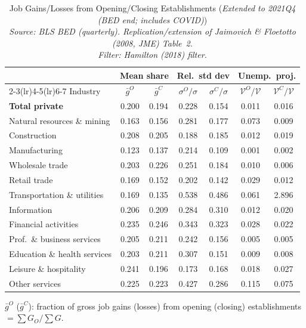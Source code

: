 \begin{table}[htbp]
\centering
\small
\caption{Job Gains/Losses from Opening/Closing Establishments (\emph{Extended to 2021Q4 (BED end; includes COVID)}) \\
  \emph{Source: BLS BED (quarterly). Replication/extension of Jaimovich \& Floetotto (2008, JME) Table~2.} \\  \emph{Filter: Hamilton (2018) filter.}}
\label{tab:jf_t2_ext_2021_ham}
\begin{tabular}{lcccccc}
\toprule
 & \multicolumn{2}{c}{Mean share} & \multicolumn{2}{c}{Rel.\ std dev} & \multicolumn{2}{c}{Unemp.\ proj.} \\
\cmidrule(lr){2-3}\cmidrule(lr){4-5}\cmidrule(lr){6-7}
Industry & $\bar{g}^O$ & $\bar{g}^C$ & $\sigma^O/\sigma$ & $\sigma^C/\sigma$ & $\mathcal{V}^O/\mathcal{V}$ & $\mathcal{V}^C/\mathcal{V}$ \\
\midrule
\midrule
\textbf{Total private} & 0.200 & 0.194 & 0.228 & 0.154 & 0.011 & 0.016 \\
Natural resources \& mining & 0.163 & 0.156 & 0.281 & 0.177 & 0.073 & 0.009 \\
Construction & 0.208 & 0.205 & 0.188 & 0.185 & 0.012 & 0.019 \\
Manufacturing & 0.123 & 0.137 & 0.214 & 0.109 & 0.001 & 0.002 \\
Wholesale trade & 0.203 & 0.226 & 0.251 & 0.184 & 0.010 & 0.006 \\
Retail trade & 0.169 & 0.152 & 0.202 & 0.142 & 0.029 & 0.012 \\
Transportation \& utilities & 0.169 & 0.135 & 0.538 & 0.486 & 0.061 & 2.896 \\
Information & 0.206 & 0.209 & 0.284 & 0.310 & 0.012 & 0.020 \\
Financial activities & 0.235 & 0.246 & 0.343 & 0.323 & 0.028 & 0.022 \\
Prof.~\& business services & 0.205 & 0.211 & 0.242 & 0.156 & 0.005 & 0.005 \\
Education \& health services & 0.203 & 0.211 & 0.307 & 0.151 & 0.009 & 0.008 \\
Leisure \& hospitality & 0.241 & 0.196 & 0.173 & 0.168 & 0.018 & 0.027 \\
Other services & 0.225 & 0.223 & 0.427 & 0.286 & 0.115 & 0.075 \\
\bottomrule
\end{tabular}
\begin{tablenotes}[flushleft]\footnotesize
\item $\bar{g}^O$ ($\bar{g}^C$): fraction of gross job gains (losses) from opening (closing) establishments $= \sum G_O / \sum G$.

\end{tablenotes}
\end{table}
